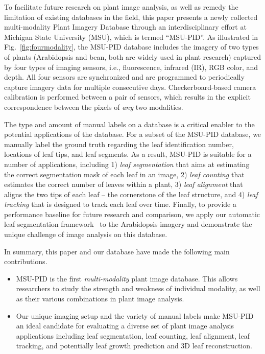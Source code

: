 To facilitate future research on plant image analysis, as well as remedy the limitation of existing databases in the field, this paper presents a newly collected multi-modality Plant Imagery Database through an interdisciplinary effort at Michigan State University (MSU), which is termed ``MSU-PID''.
As illustrated in Fig.~\ref{fig:fourmodality}, the MSU-PID database includes the imagery of two types of plants (Arabidopsis and bean, both are widely used in plant research) captured by four types of imaging sensors, i.e., fluorescence, infrared (IR), RGB color, and depth.
All four sensors are synchronized and are programmed to periodically capture imagery data for multiple consecutive days.
Checkerboard-based camera calibration is performed between a pair of sensors, which results in the explicit correspondence between the pixels of {\it any} two modalities.

The type and amount of manual labels on a database is a critical enabler to the potential applications of the database.
For a subset of the MSU-PID database, we manually label the ground truth regarding the leaf identification number, locations of leaf tips, and leaf segments.
As a result, MSU-PID is suitable for a number of applications, including 1) {\it leaf segmentation} that aims at estimating the correct segmentation mask of each leaf in an image, 2) {\it leaf counting} that estimates the correct number of leaves within a plant, 3) {\it leaf alignment} that aligns the two tips of each leaf -- the cornerstone of the leaf structure, and 4) {\it leaf tracking} that is designed to track each leaf over time.
Finally, to provide a performance baseline for future research and comparison, we apply our automatic leaf segmentation framework~\cite{yin2014a,yin2014b} to the Arabidopsis imagery and demonstrate the unique challenge of image analysis on this database.

In summary, this paper and our database have made the following main contributions.
\begin{itemize}
\item MSU-PID is the first {\it multi-modality} plant image database. This allows researchers to study the strength and weakness of individual modality, as well as their various combinations in plant image analysis.
\item Our unique imaging setup and the variety of manual labels make MSU-PID an ideal candidate for evaluating a diverse set of plant image analysis applications including leaf segmentation, leaf counting, leaf alignment, leaf tracking, and potentially leaf growth prediction and $3$D leaf reconstruction.
\end{itemize}










